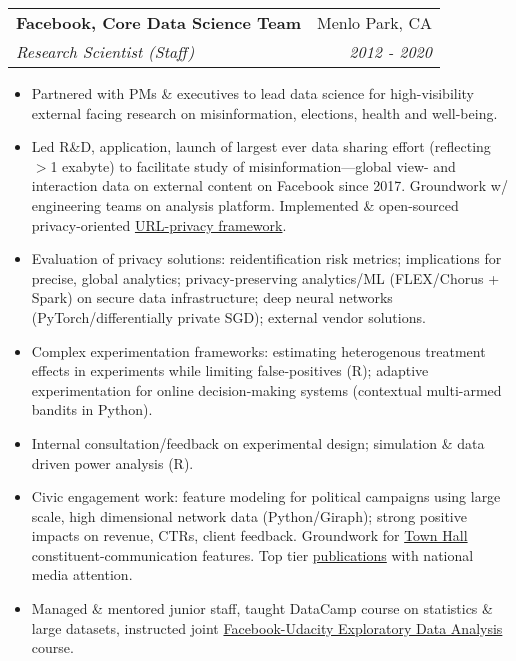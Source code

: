 \documentclass[letterpaper,11pt]{article}
\makeatletter
\newcommand{\resitem}[1]{\item #1 \vspace{-6pt}}
\newcommand{\ressubheading}[4]{\vspace{2pt}
\begin{tabular*}{7.58in}{l@{\extracolsep{\fill}}r}
		\textbf{#1} & #2 \\
		\textit{#3} & \textit{#4} \\
\end{tabular*}\vspace{-1pt}}
\makeatother
\begin{document}
\ressubheading{Facebook, Core Data Science Team}{Menlo Park, CA}{Research Scientist (Staff)}{2012 - 2020}
	\begin{itemize}
       	 	\resitem{Partnered with PMs \& executives to lead data science for high-visibility external facing research on misinformation, elections, health and well-being.} 
		\resitem{Led R\&D, application, launch of largest ever data sharing effort (reflecting $>$1 exabyte) to facilitate study of misinformation---global view- and interaction data on external content on Facebook since 2017. Groundwork w/ engineering teams on analysis platform. Implemented \& open-sourced privacy-oriented \href{https://github.com/facebookresearch/URL-Sanitization}{URL-privacy framework}.}
		\resitem{Evaluation of privacy solutions: reidentification risk metrics; implications for precise, global analytics; privacy-preserving analytics/ML (FLEX/Chorus + Spark) on secure data infrastructure; deep neural networks (PyTorch/differentially private SGD); external vendor solutions.}
		\resitem{Complex experimentation frameworks: estimating heterogenous treatment effects in experiments while limiting false-positives (R); adaptive experimentation for online decision-making systems (contextual multi-armed bandits in Python).}
		\resitem{Internal consultation/feedback on experimental design; simulation \& data driven power analysis (R).}
		\resitem{Civic engagement work: feature modeling for political campaigns using large scale, high dimensional network data (Python/Giraph); strong positive impacts on revenue, CTRs, client feedback. Groundwork for \href{https://www.facebook.com/townhall/}{Town Hall} constituent-communication features. Top tier \href{https://dl.dropboxusercontent.com/u/25710348/Science-2015-Bakshy-1130-2.pdf}{publications} with national media attention. }
		\resitem{Managed \& mentored junior staff, taught DataCamp course on statistics \& large datasets, instructed joint \href{https://www.udacity.com/course/data-analysis-with-r--ud651}{Facebook-Udacity Exploratory Data Analysis} course.}
	\end{itemize}
\end{document}
